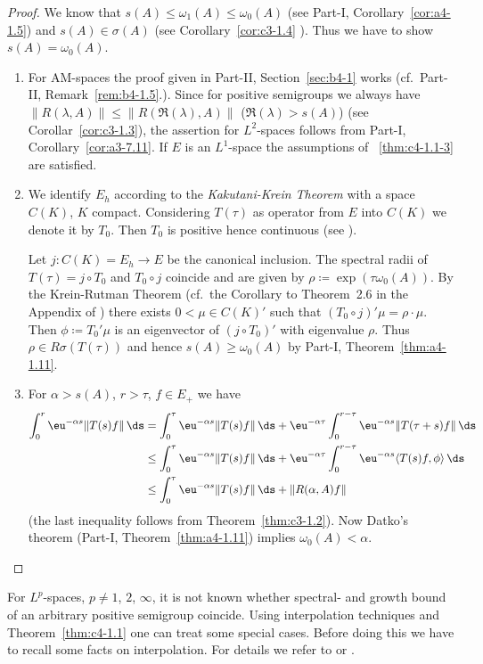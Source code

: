 \begin{proof}
We know that $s(A) \leq \omega_{1}(A) \leq \omega_{0}(A)$ (see Part-I, Corollary~\ref{cor:a4-1.5}) and $s(A) \in \sigma(A)$ (see Corollary~\ref{cor:c3-1.4} ).
Thus we have to show $s(A) = \omega_{0}(A)$.
\begin{enumerate}[\upshape (i), wide, labelindent=.25em]
\item 
For AM-spaces the proof given in Part-II, Section~\ref{sec:b4-1} works (cf.\ Part-II, Remark~\ref{rem:b4-1.5}.).
Since for positive semigroups we always have $\|R(\lambda,A)\| \leq \|R(\Re(\lambda), A)\|$ ($\Re(\lambda) > s(A)$) (see   Corollar~\ref{cor:c3-1.3}), the assertion for $L^{2}$-spaces follows from Part-I, Corollary~\ref{cor:a3-7.11}.
If\/ $E$ is an $L^{1}$-space the assumptions of ~\ref{thm:c4-1.1-3} are satisfied.

\item 
We identify $E_{h}$ according to the \emph{Kakutani-Krein Theorem} with a space $C(K)$, $K$ compact.
Considering $T(\tau)$ as operator from $E$ into $C(K)$ we denote it by $T_{0}$.
Then $T_{0}$ is positive hence continuous (see \textcite[Theorem~5.3]{schaefer:1974}).

Let $j \colon C(K) = E_{h} \to E$ be the canonical inclusion.
The spectral radii of\/ $T(\tau) = j \circ T_{0}$ and $T_{0} \circ j$ coincide and are given by $\rho \coloneq  \exp(\tau \omega_{0}(A))$.
By the Krein-Rutman Theorem (cf.\ the Corollary to Theorem~2.6 in the Appendix of \textcite{schaefer:1966}) there exists $0 < \mu \in C(K)'$ such that $(T_{0} \circ j)'\mu = \rho \cdot \mu$.
Then $\phi \coloneq  T_{0}'\mu$ is an eigenvector of\/ $(j \circ T_{0})'$ with eigenvalue $\rho$.
Thus $\rho \in R\sigma(T(\tau))$ and hence $s(A) \geq \omega_{0}(A)$ by Part-I, Theorem~\ref{thm:a4-1.11}.

\item
For $\alpha > s(A)$, $r > \tau$, $f \in E_{+}$ we have
\begin{align*}
\int_{0}^{r} \eu^{-\alpha s}\|T(s)f\| \, \ds &= \int_{0}^{\tau} \eu^{-\alpha s}\|T(s)f\| \, \ds + \eu^{-\alpha \tau}\int_{0}^{r-\tau} \eu^{-\alpha s}\|T(\tau+s)f\| \, \ds \\
&\leq \int_{0}^{\tau} \eu^{-\alpha s}\|T(s)f\| \, \ds + \eu^{-\alpha \tau}\int_{0}^{r-\tau} \eu^{-\alpha s}\langle T(s)f,\phi \rangle \, \ds \\
&\leq \int_{0}^{\tau} \eu^{-\alpha s}\|T(s)f\| \, \ds + \|R(\alpha,A)f\|
\end{align*}
(the last inequality follows from Theorem~\ref{thm:c3-1.2}).
Now Datko's theorem (Part-I, Theorem~\ref{thm:a4-1.11}) implies $\omega_{0}(A) < \alpha$.
\end{enumerate}
\end{proof}
For $L^{p}$-spaces, $p \neq 1$, $2$, $\infty$, it is not known whether spectral- and growth bound of an arbitrary positive semigroup coincide.
Using interpolation techniques and  Theorem~\ref{thm:c4-1.1}  one can treat some special cases.
Before doing this we have to recall some facts on interpolation.
For details we refer to 
\textcite[VI.10]{dunfordschwartz:1958} or \textcite[IX.4.]{reedsimon:1975}.

